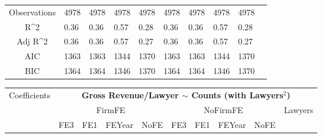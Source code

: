 \documentclass{article}
\begin{document}
\begin{table}[H]
\begin{tabular}{|clllllllll|}
   &  &  &  &  &  &  &  &  & \\ 
  \hline 
 Observations & 4978 & 4978 & 4978 & 4978 & 4978 & 4978 & 4978 & 4978 & \\ 
  R^2 & 0.36 & 0.36 & 0.57 & 0.28 & 0.36 & 0.36 & 0.57 & 0.28 & \\ 
  Adj R^2 & 0.36 & 0.36 & 0.57 & 0.27 & 0.36 & 0.36 & 0.57 & 0.27 & \\ 
  AIC & 1363 & 1363 & 1344 & 1370 & 1363 & 1363 & 1344 & 1370 & \\ 
  BIC & 1364 & 1364 & 1346 & 1370 & 1364 & 1364 & 1346 & 1370 & \\ 
   \hline
\end{tabular}
 
\end{table}


\begin{table}[H]
\centering
\begin{tabular}{|clllllllll|}
\hline
\multirow{3}{*}{Coefficients} & \multicolumn{9}{c|}{\textbf{Gross Revenue/Lawyer $\sim$ Counts (with Lawyers$^2$)}} \\
\cline{2-10}
& \multicolumn{4}{c}{FirmFE} & \multicolumn{4}{c}{NoFirmFE} & \multirow{2}{*}{Lawyers} \\
\cline{2-9}
& FE3 & FE1 & FEYear & NoFE & FE3 & FE1 & FEYear & NoFE &  \\
\hline
 

\end{tabular}
\end{table}
\end{document}
